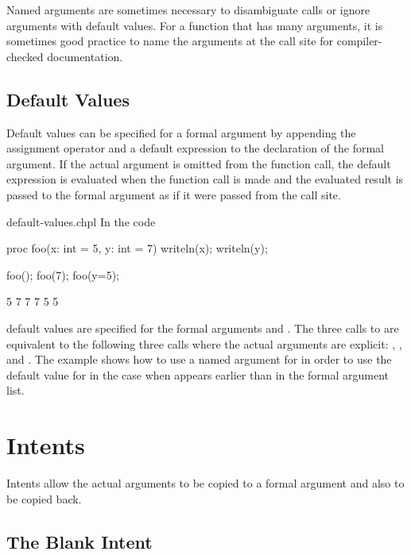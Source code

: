 Named arguments are sometimes necessary to disambiguate calls or
ignore arguments with default values.  For a function that has many
arguments, it is sometimes good practice to name the arguments at the
call site for compiler-checked documentation.

\subsection{Default Values}
\label{Default_Values}

Default values can be specified for a formal argument by appending the
assignment operator and a default expression to the declaration of the
formal argument.  If the actual argument is omitted from the function
call, the default expression is evaluated when the function call is
made and the evaluated result is passed to the formal argument as if
it were passed from the call site.

\begin{chapelexample}{default-values.chpl}
In the code
\begin{chapel}
proc foo(x: int = 5, y: int = 7) { writeln(x); writeln(y); }

foo();
foo(7);
foo(y=5);
\end{chapel}
\begin{chapeloutput}
5
7
7
7
5
5
\end{chapeloutput}
default values are specified for the formal arguments 
and .  The three calls to  are equivalent to the
following three calls where the actual arguments are
explicit: , , and .
The example  shows how to use a named argument
for  in order to use the default value for  in the
case when  appears earlier than  in the formal
argument list.
\end{chapelexample}


\section{Intents}
\label{Intents}

Intents allow the actual arguments to be copied to a formal argument
and also to be copied back.

\subsection{The Blank Intent}
\label{The_Blank_Intent}

